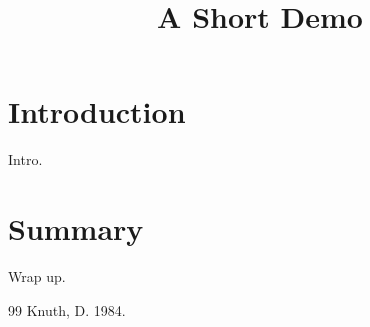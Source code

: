 \documentclass[article]{jss}
\title{A Short Demo}
\begin{document}
\section{Introduction}
Intro.
\section{Summary}
Wrap up.
\begin{thebibliography}{99}
 Knuth, D. 1984.
\end{thebibliography}
\end{document}
